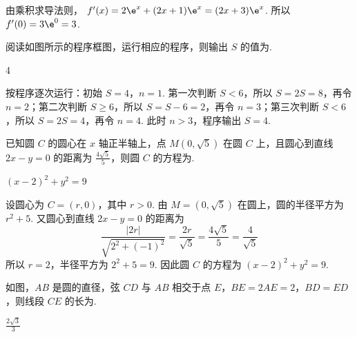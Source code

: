 \begin{solution}
由乘积求导法则，
\(f'(x)=2\e^x+(2x+1)\e^x=(2x+3)\e^x\). 所以
\(f'(0)=3\e^0=3\).
\end{solution}

\begin{problem}
阅读如图所示的程序框图，运行相应的程序，则输出 \(S\) 的值为\fillinblank{}.

\end{problem}

\begin{answer}
4
\end{answer}

\begin{solution}
按程序逐次运行：初始 \(S=4\)，\(n=1\). 第一次判断 \(S<6\)，所以
\(S=2S=8\)，再令 \(n=2\)；第二次判断 \(S\geqslant6\)，所以
\(S=S-6=2\)，再令 \(n=3\)；第三次判断 \(S<6\)，所以
\(S=2S=4\)，再令 \(n=4\). 此时 \(n>3\)，程序输出 \(S=4\).
\end{solution}

\begin{problem}
已知圆 \(C\) 的圆心在 \( x \) 轴正半轴上，点 \(M\left( 0,\sqrt5 \right) \) 在圆 \(C\) 上，且圆心到直线 \( 2x-y=0 \) 的距离为 \( \frac{4\sqrt5}{5} \)，则圆 \(C\) 的方程为\fillinblank{}.
\end{problem}

\begin{answer}
\( (x-2)^2+y^2=9 \)
\end{answer}

\begin{solution}
设圆心为 \(C=(r,0)\)，其中 \(r>0\). 由 \(M=(0,\sqrt5)\) 在圆上，圆的半径平方为
\(r^2+5\). 又圆心到直线 \(2x-y=0\) 的距离为
\[
\dfrac{|2r|}{\sqrt{2^2+(-1)^2}}=\dfrac{2r}{\sqrt5}=\dfrac{4\sqrt5}{5}=\dfrac4{\sqrt5}
\]
所以 \(r=2\)，半径平方为 \(2^2+5=9\). 因此圆 \(C\) 的方程为
\((x-2)^2+y^2=9\).
\end{solution}

\begin{problem}
如图，\(AB\) 是圆的直径，弦 \(CD\) 与 \(AB\) 相交于点 \(E\)，\( BE=2AE=2 \)，\( BD=ED \)，则线段 \(CE\) 的长为\fillinblank{}.

\end{problem}

\begin{answer}
\(\frac{2\sqrt3}{3}\)
\end{answer}

